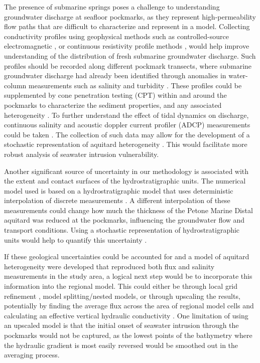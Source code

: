 \documentclass[draft, 10pt]{agujournal2019}
\begin{document}
The presence of submarine springs poses a challenge to understanding groundwater discharge at seafloor pockmarks,
as they represent high-permeability flow paths that are difficult to characterize and represent in a model.
Collecting conductivity profiles using geophysical methods such as controlled-source electromagnetic \cite{gustafson_aquifer_2019, micallef_3d_2020},
or continuous resistivity profile methods \cite{becker_locating_2023}, would help improve understanding of the distribution of fresh submarine groundwater discharge.
Such profiles should be recorded along different pockmark transects,
where submarine groundwater discharge had already been identified through anomalies in water-column measurements such as salinity and turbidity \cite{hoffmann_fresh_2023}.
These profiles could be supplemented by cone penetration testing (CPT) within and around the pockmarks to characterize the sediment properties,
and any associated heterogeneity \cite{reusch_giant_2015}.
To further understand the effect of tidal dynamics on discharge, continuous salinity and acoustic doppler current profiler (ADCP) measurements could be taken \cite{poulsen_detecting_2015}.
The collection of such data may allow for the development of a stochastic representation of aquitard heterogeneity \cite{van_leer_investigating_2025}.
This would facilitate more robust analysis of seawater intrusion vulnerability.

Another significant source of uncertainty in our methodology is associated with the extent and contact surfaces of the hydrostratigraphic units.
The numerical model used is based on a hydrostratigraphic model that uses deterministic interpolation of discrete measurements \cite{begg_revised_2023}.
A different interpolation of these measurements could change how much the thickness of the Petone Marine Distal aquitard was reduced at the pockmarks, influencing the groundwater flow and transport conditions.
Using a stochastic representation of hydrostratigraphic units would help to quantify this uncertainty \cite{de_la_varga_gempy_2019, haehnel_development_2024, bardot_seamless_2025}.

If these geological uncertainties could be accounted for and a model of aquitard heterogeneity were developed that reproduced both flux and salinity measurements in the study area,
a logical next step would be to incorporate this information into the regional model.
This could either be through local grid refinement \cite{hughes_flopy_2024}, model splitting/nested models,
or through upscaling the results, potentially by finding the average flux across the area of regional model cells and calculating an effective vertical hydraulic conductivity \cite{van_leer_estimating_2023}.
One limitation of using an upscaled model is that the initial onset of seawater intrusion through the pockmarks would not be captured,
as the lowest points of the bathymetry where the hydraulic gradient is most easily reversed would be smoothed out in the averaging process.
\end{document}
